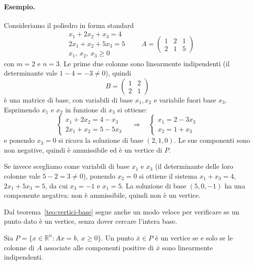 \paragraph{Esempio.}
Consideriamo il poliedro in forma standard
\[
\begin{aligned}
&x_1 + 2x_2 + x_3 = 4 \\
&2x_1 + x_2 + 5x_3 = 5 \\
&x_1,\, x_2,\, x_3 \ge 0
\end{aligned}
\qquad
A = \begin{pmatrix} 1 & 2 & 1 \\ 2 & 1 & 5 \end{pmatrix}
\]
con $m = 2$ e $n = 3$. Le prime due colonne sono linearmente indipendenti (il determinante vale $1 - 4 = -3 \neq 0$), quindi
\[
B = \begin{pmatrix} 1 & 2 \\ 2 & 1 \end{pmatrix}
\]
è una matrice di base, con variabili di base $x_1, x_2$ e variabile fuori base $x_3$. Esprimendo $x_1$ e $x_2$ in funzione di $x_3$ si ottiene:
\[
\begin{cases}
x_1 + 2x_2 = 4 - x_3 \\
2x_1 + x_2 = 5 - 5x_3
\end{cases}
\quad\Longrightarrow\quad
\begin{cases}
x_1 = 2 - 3x_3 \\
x_2 = 1 + x_3
\end{cases}
\]
e ponendo $x_3 = 0$ si ricava la soluzione di base $(2, 1, 0)$. Le sue componenti sono non negative, quindi è ammissibile ed è un vertice di $P$.

Se invece scegliamo come variabili di base $x_1$ e $x_3$ (il determinante delle loro colonne vale $5 - 2 = 3 \neq 0$), ponendo $x_2 = 0$ si ottiene il sistema $x_1 + x_3 = 4$, $2x_1 + 5x_3 = 5$, da cui $x_3 = -1$ e $x_1 = 5$. La soluzione di base $(5, 0, -1)$ ha una componente negativa: non è ammissibile, quindi non è un vertice.

Dal teorema~\ref{teo:vertici-base} segue anche un modo veloce per verificare se un punto dato è un vertice, senza dover cercare l'intera base.

\begin{corollario}\label{cor:colonne}
Sia $P = \{x \in \mathbb{R}^n : A x = b,\ x \ge 0\}$. Un punto $\bar{x} \in P$ è un vertice se e solo se le colonne di $A$ associate alle componenti positive di $\bar{x}$ sono linearmente indipendenti.
\end{corollario}

